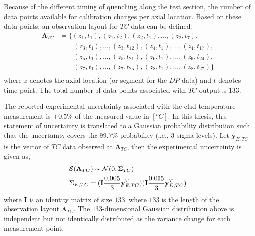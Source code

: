 Because of the different timing of quenching along the test section, the number of data points available for calibration changes per axial location.
Based on these data points, an observation layout for $TC$ data can be defined,
\begin{equation}
	\begin{split}
		\boldsymbol{\Lambda}_{TC} & = \{(z_1,t_1),(z_1,t_{2}),(z_2,t_1),\ldots,(z_2,t_{7}),\\
															& \quad\quad (z_3,t_1),\ldots,(z_3,t_{12}),(z_4,t_1),\ldots,(z_4,t_{17}),  \\
															& \quad\quad (z_5,t_1),\ldots,(z_5,t_{21}),(z_6,t_1),\ldots,(z_6,t_{24}),  \\
															& \quad\quad (z_7,t_1),\ldots,(z_7,t_{25}),(z_8,t_1),\ldots,(z_8,t_{27})\} \\
	\end{split}
\label{eq:bc_observation_layout_feba_tc}
\end{equation}
where $z$ denotes the axial location (or segment for the $DP$ data) and $t$ denotes time point.
The total number of data points associated with $TC$ output is $133$.

The reported experimental uncertainty associated with the clad temperature measurement is $\pm0.5\%$ of the measured value in $[^oC]$.
In this thesis, this statement of uncertainty is translated to a Gaussian probability distribution such that the uncertainty covers the $99.7\%$ probability (i.e., $3$ sigma levels).
Let $\mathbf{y}_{E,TC}$ is the vector of $TC$ data observed at $\boldsymbol{\Lambda}_{TC}$, then the experimental uncertainty is given as,
\begin{equation}
	\begin{split}
		& \mathcal{E}(\boldsymbol{\Lambda}_{TC}) \thicksim \mathcal{N}(0, \Sigma_{TC})\\
		& \Sigma_{E,TC} = (\mathbf{I} \frac{0.005}{3} \mathbf{y}_{E,TC}^T) (\mathbf{I} \frac{0.005}{3} \mathbf{y}_{E,TC}^T)
	\end{split}	
\label{eq:bc_experimental_uncertainty_feba_tc}
\end{equation}
where $\mathbf{I}$ is an identity matrix of size $133$, where $133$ is the length of the observation layout $\boldsymbol{\Lambda}_{TC}$.
The $133$-dimensional Gaussian distribution above is independent but not identically distributed as the variance change for each measurement point.

